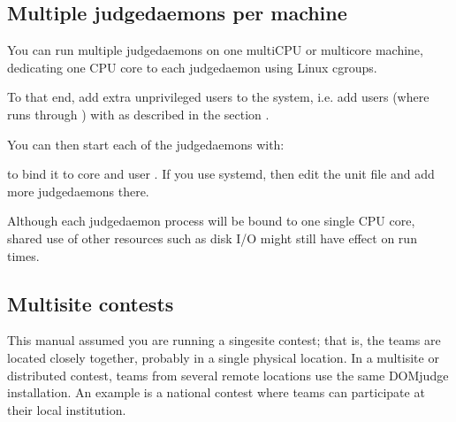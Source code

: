 \documentclass[a4paper,10pt,english,openany]{sphinxmanual}
\begin{document}
\begin{sphinxVerbatim}[commandchars=\\\{\}]
  \PYG{p}{[}\PYG{p}{]}     \PYG{p}{[}\PYG{p}{]} 
\end{sphinxVerbatim}


\subsection{Multiple judgedaemons per machine}
\label{\detokenize{config-advanced:multiple-judgedaemons-per-machine}}\label{\detokenize{config-advanced:multiple-judgedaemons}}
\sphinxAtStartPar
You can run multiple judgedaemons on one multi\sphinxhyphen{}CPU or multi\sphinxhyphen{}core
machine, dedicating one CPU core to each judgedaemon using Linux
cgroups.

\sphinxAtStartPar
To that end, add extra unprivileged users to the system, i.e. add users
 (where  runs through ) with
 as described in the section {\hyperref[\detokenize{install-judgehost:installing-judgehost}]{}}.

\sphinxAtStartPar
You can then start each of the judgedaemons with:

\begin{sphinxVerbatim}[commandchars=\\\{\}]
  
\end{sphinxVerbatim}

\sphinxAtStartPar
to bind it to core  and user . If you use
systemd, then edit the  unit file and add
more judgedaemons there.

\sphinxAtStartPar
Although each judgedaemon process will be bound to one single CPU
core, shared use of other resources such as disk I/O might
still have effect on run times.


\subsection{Multi\sphinxhyphen{}site contests}
\label{\detokenize{config-advanced:multi-site-contests}}
\sphinxAtStartPar
This manual assumed you are running a singe\sphinxhyphen{}site contest; that is, the teams
are located closely together, probably in a single physical location. In a
multi\sphinxhyphen{}site or distributed contest, teams from several remote locations use the
same DOMjudge installation. An example is a national contest where teams can
participate at their local institution.
\end{document}
